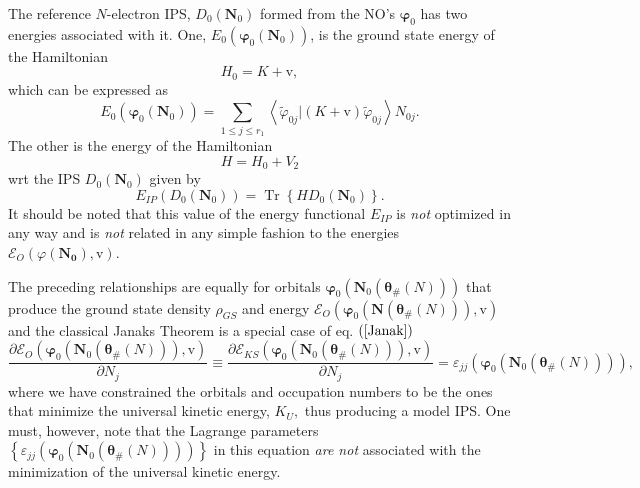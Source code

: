 \documentclass[aps,preprint]{revtex4}%
\begin{document}
The reference $N$-electron IPS, $D_{0}\left(  \boldsymbol{\boldsymbol{N}}%
_{0}\right)  $ formed from the NO's $\boldsymbol{\varphi}_{0}$ has two
energies associated with it. One, $E_{0}\left(  \boldsymbol{\varphi}%
_{0}\left(  \boldsymbol{N}_{0}\right)  \right)  $, is the ground state energy
of the Hamiltonian%
\begin{equation}
H_{0}=K+\mathrm{v},
\end{equation}
which can be expressed as
\begin{equation}
E_{0}\left(  \boldsymbol{\varphi}_{0}\left(  \boldsymbol{N}_{0}\right)
\right)  =\sum_{1\leq j\leq r_{1}}\left\langle \tilde{\varphi}_{0j}\left\vert
\left(  K+\mathrm{v}\right)  \right.  \tilde{\varphi}_{0j}\right\rangle
N_{0j}.
\end{equation}
The other is the energy of the Hamiltonian
\begin{equation}
H=H_{0}+V_{2}%
\end{equation}
wrt the IPS $D_{0}\left(  \boldsymbol{N}_{0}\right)  $ given by
\begin{equation}
E_{IP}\left(  D_{0}\left(  \boldsymbol{N}_{0}\right)  \right)
=\operatorname{Tr}\left\{  HD_{0}\left(  \boldsymbol{N}_{0}\right)  \right\}
.
\end{equation}
It should be noted that this value of the energy functional $E_{IP}$ is
\emph{not }optimized in any way and is \emph{not }related in any simple
fashion to the energies $\mathcal{E}_{O}\left(  \varphi\boldsymbol{\left(
\boldsymbol{N}_{0}\right)  },\mathrm{v}\right)  .$ 

The preceding relationships are equally for orbitals $\boldsymbol{\varphi}%
_{0}\left(  \boldsymbol{N}_{0}\left(  \boldsymbol{\theta}_{\#}\left(
N\right)  \right)  \right)  $ that produce the ground state density $\rho
_{GS}$ and energy $\mathcal{E}_{O}\left(  \boldsymbol{\varphi}_{0}\left(
\boldsymbol{N}\left(  \boldsymbol{\theta}_{\#}\left(  N\right)  \right)
\right)  ,\mathrm{v}\right)  $ and the classical Janaks Theorem is a special
case of eq. $\left(  \ref{Janak}\right)  $
\begin{equation}
\frac{\partial\mathcal{E}_{O}\left(  \boldsymbol{\varphi}_{0}\left(
\boldsymbol{N}_{0}\left(  \boldsymbol{\theta}_{\#}\left(  N\right)  \right)
\right)  ,\mathrm{v}\right)  }{\partial N_{j}}\equiv\frac{\partial
\mathcal{E}_{KS}\left(  \boldsymbol{\varphi}_{0}\left(  \boldsymbol{N}%
_{0}\left(  \boldsymbol{\theta}_{\#}\left(  N\right)  \right)  \right)
,\mathrm{v}\right)  }{\partial N_{j}}=\varepsilon_{jj}\left(
\boldsymbol{\varphi}_{0}\left(  \boldsymbol{N}_{0}\left(  \boldsymbol{\theta
}_{\#}\left(  N\right)  \right)  \right)  \right)  ,\label{ClassJanak}%
\end{equation}
where we have constrained the orbitals and occupation numbers to be the ones
that minimize the universal kinetic energy, $K_{U},$ thus producing a model
IPS. One must, however, note that the Lagrange parameters $\left\{
\varepsilon_{jj}\left(  \boldsymbol{\varphi}_{0}\left(  \boldsymbol{N}%
_{0}\left(  \boldsymbol{\theta}_{\#}\left(  N\right)  \right)  \right)
\right)  \right\}  $ in this equation \emph{are not }associated with the
minimization of the universal kinetic energy.
\end{document}
